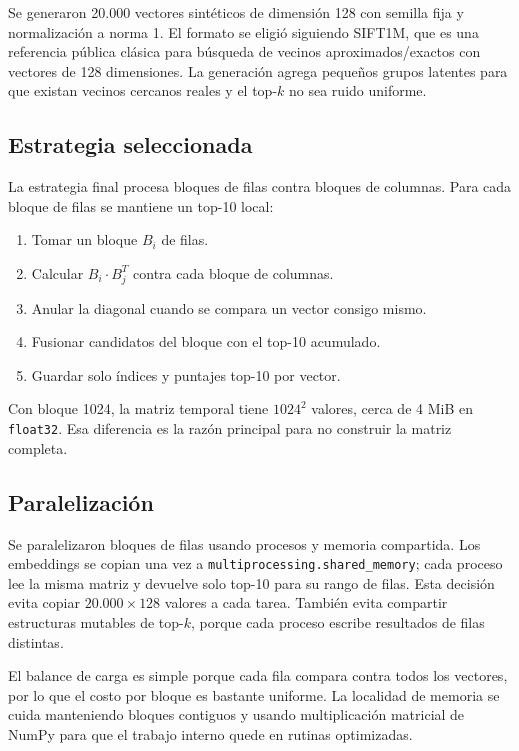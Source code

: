 \documentclass[letterpaper,11pt]{article}
\begin{document}
Se generaron 20.000 vectores sintéticos de dimensión 128 con semilla fija y normalización a norma 1. El formato se eligió siguiendo SIFT1M, que es una referencia pública clásica para búsqueda de vecinos aproximados/exactos con vectores de 128 dimensiones. La generación agrega pequeños grupos latentes para que existan vecinos cercanos reales y el top-\(k\) no sea ruido uniforme.

\subsection{Estrategia seleccionada}

La estrategia final procesa bloques de filas contra bloques de columnas. Para cada bloque de filas se mantiene un top-10 local:

\begin{enumerate}[itemsep=0.1cm]
    \item Tomar un bloque \(B_i\) de filas.
    \item Calcular \(B_i \cdot B_j^T\) contra cada bloque de columnas.
    \item Anular la diagonal cuando se compara un vector consigo mismo.
    \item Fusionar candidatos del bloque con el top-10 acumulado.
    \item Guardar solo índices y puntajes top-10 por vector.
\end{enumerate}

Con bloque 1024, la matriz temporal tiene \(1024^2\) valores, cerca de 4 MiB en \texttt{float32}. Esa diferencia es la razón principal para no construir la matriz completa.

\subsection{Paralelización}

Se paralelizaron bloques de filas usando procesos y memoria compartida. Los embeddings se copian una vez a \texttt{multiprocessing.shared\_memory}; cada proceso lee la misma matriz y devuelve solo top-10 para su rango de filas. Esta decisión evita copiar \(20.000 \times 128\) valores a cada tarea. También evita compartir estructuras mutables de top-\(k\), porque cada proceso escribe resultados de filas distintas.

El balance de carga es simple porque cada fila compara contra todos los vectores, por lo que el costo por bloque es bastante uniforme. La localidad de memoria se cuida manteniendo bloques contiguos y usando multiplicación matricial de NumPy para que el trabajo interno quede en rutinas optimizadas.
\end{document}
